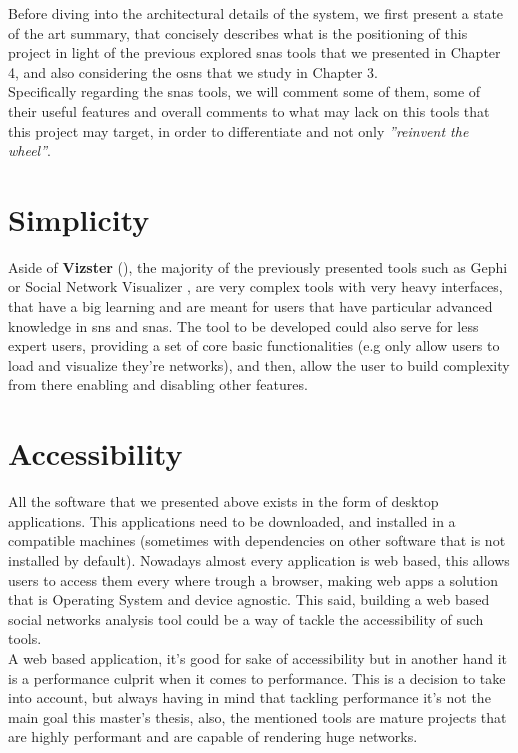 Before diving into the architectural details of the system, we first present a state of the art summary, that concisely describes what is the positioning of this project in light of the previous explored \glspl{sna} tools that we presented in Chapter 4, and also considering the \glspl{osn} that we study in Chapter 3.\\
\indent Specifically regarding the \glspl{sna} tools, we will comment some of them, some of their useful features and overall comments to what may lack on this tools that this project may target, in order to differentiate and not only \textit{''reinvent the wheel''}.

\section{Simplicity}
Aside of \textbf{Vizster} (\cite{heer2005vizster}), the majority of the previously presented tools such as Gephi \cite{bastian2009gephi} or Social Network Visualizer \cite{socnetv}, are very complex tools with very heavy interfaces, that have a big learning and are meant for users that have particular advanced knowledge in \glspl{sn} and \glspl{sna}. The tool to be developed could also serve for less expert users, providing a set of core basic functionalities (e.g only allow users to load and visualize they're networks), and then, allow the user to build complexity from there enabling and disabling other features.

\section{Accessibility}
All the software that we presented above exists in the form of desktop applications. This applications need to be downloaded, and installed in a compatible machines (sometimes with dependencies on other software that is not installed by default). Nowadays almost every application is web based, this allows users to access them every where trough a browser, making web apps a solution that is Operating System and device agnostic. This said, building a web based social networks analysis tool could be a way of tackle the accessibility of such tools.\\
\indent A web based application, it's good for sake of accessibility but in another hand it is a performance culprit when it comes to performance. This is a decision to take into account, but always having in mind that tackling performance it's not the main goal this master's thesis, also, the mentioned tools are mature projects that are highly performant and are capable of rendering huge networks.

